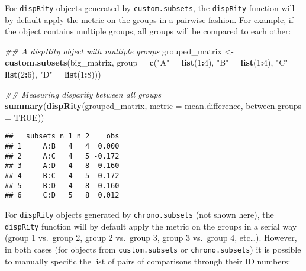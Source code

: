 \documentclass[
]{book}
\newenvironment{Shaded}{\begin{snugshade}}{\end{snugshade}}
\newcommand{\CommentTok}[1]{\textcolor[rgb]{0.56,0.35,0.01}{\textit{#1}}}
\newcommand{\DataTypeTok}[1]{\textcolor[rgb]{0.13,0.29,0.53}{#1}}
\newcommand{\DecValTok}[1]{\textcolor[rgb]{0.00,0.00,0.81}{#1}}
\newcommand{\KeywordTok}[1]{\textcolor[rgb]{0.13,0.29,0.53}{\textbf{#1}}}
\newcommand{\NormalTok}[1]{#1}
\newcommand{\OperatorTok}[1]{\textcolor[rgb]{0.81,0.36,0.00}{\textbf{#1}}}
\newcommand{\OtherTok}[1]{\textcolor[rgb]{0.56,0.35,0.01}{#1}}
\newcommand{\StringTok}[1]{\textcolor[rgb]{0.31,0.60,0.02}{#1}}
\begin{document}
For \texttt{dispRity} objects generated by \texttt{custom.subsets}, the \texttt{dispRity} function will by default apply the metric on the groups in a pairwise fashion.
For example, if the object contains multiple groups, all groups will be compared to each other:

\begin{Shaded}
\begin{Highlighting}[]
\CommentTok{\#\# A dispRity object with multiple groups}
\NormalTok{grouped\_matrix \textless{}{-}}\StringTok{ }\KeywordTok{custom.subsets}\NormalTok{(big\_matrix,}
                                 \DataTypeTok{group =} \KeywordTok{c}\NormalTok{(}\StringTok{"A"}\NormalTok{ =}\StringTok{ }\KeywordTok{list}\NormalTok{(}\DecValTok{1}\OperatorTok{:}\DecValTok{4}\NormalTok{),}
                                           \StringTok{"B"}\NormalTok{ =}\StringTok{ }\KeywordTok{list}\NormalTok{(}\DecValTok{1}\OperatorTok{:}\DecValTok{4}\NormalTok{),}
                                           \StringTok{"C"}\NormalTok{ =}\StringTok{ }\KeywordTok{list}\NormalTok{(}\DecValTok{2}\OperatorTok{:}\DecValTok{6}\NormalTok{), }
                                           \StringTok{"D"}\NormalTok{ =}\StringTok{ }\KeywordTok{list}\NormalTok{(}\DecValTok{1}\OperatorTok{:}\DecValTok{8}\NormalTok{)))}

\CommentTok{\#\# Measuring disparity between all groups}
\KeywordTok{summary}\NormalTok{(}\KeywordTok{dispRity}\NormalTok{(grouped\_matrix, }\DataTypeTok{metric =}\NormalTok{ mean.difference,}
                 \DataTypeTok{between.groups =} \OtherTok{TRUE}\NormalTok{))}
\end{Highlighting}
\end{Shaded}

\begin{verbatim}
##   subsets n_1 n_2    obs
## 1     A:B   4   4  0.000
## 2     A:C   4   5 -0.172
## 3     A:D   4   8 -0.160
## 4     B:C   4   5 -0.172
## 5     B:D   4   8 -0.160
## 6     C:D   5   8  0.012
\end{verbatim}

For \texttt{dispRity} objects generated by \texttt{chrono.subsets} (not shown here), the \texttt{dispRity} function will by default apply the metric on the groups in a serial way (group 1 vs.~group 2, group 2 vs.~group 3, group 3 vs.~group 4, etc\ldots).
However, in both cases (for objects from \texttt{custom.subsets} or \texttt{chrono.subsets}) it is possible to manually specific the list of pairs of comparisons through their ID numbers:
\end{document}

